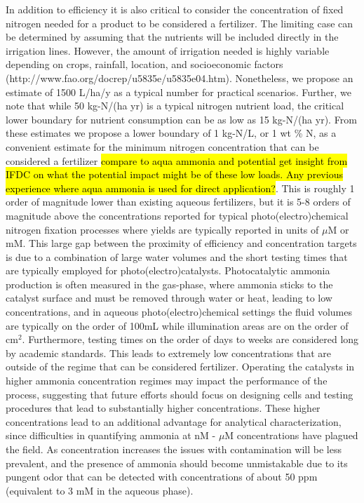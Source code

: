 In addition to efficiency it is also critical to consider the concentration of fixed nitrogen needed for a product to be considered a fertilizer. The limiting case can be determined by assuming that the nutrients will be included directly in the irrigation lines. However, the amount of irrigation needed is highly variable depending on crops, rainfall, location, and socioeconomic factors (http://www.fao.org/docrep/u5835e/u5835e04.htm). Nonetheless, we propose an estimate of 1500 L/ha/y as a typical number for practical scenarios. Further, we note that while 50 kg-N/(ha yr) is a typical nitrogen nutrient load, the critical lower boundary for nutrient consumption can be as low as 15 kg-N/(ha yr). From these estimates we propose a lower boundary of 1 kg-N/L, or 1 wt \% N, as a convenient estimate for the minimum nitrogen concentration that can be considered a fertilizer \hl{compare to aqua ammonia and potential get insight from IFDC on what the potential impact might be of these low loads. Any previous experience where aqua ammonia is used for direct application?}. This is roughly 1 order of magnitude lower than existing aqueous fertilizers, but it is 5-8 orders of magnitude above the concentrations reported for typical photo(electro)chemical nitrogen fixation processes where yields are typically reported in units of $\mu$M or mM. This large gap between the proximity of efficiency and concentration targets is due to a combination of large water volumes and the short testing times that are typically employed for photo(electro)catalysts. Photocatalytic ammonia production is often measured in the gas-phase, where ammonia sticks to the catalyst surface and must be removed through water or heat, leading to low concentrations, and in aqueous photo(electro)chemical settings the fluid volumes are typically on the order of 100mL while illumination areas are on the order of cm$^2$. Furthermore, testing times on the order of days to weeks are considered long by academic standards. This leads to extremely low concentrations that are outside of the regime that can be considered fertilizer. Operating the catalysts in higher ammonia concentration regimes may impact the performance of the process, suggesting that future efforts should focus on designing cells and testing procedures that lead to substantially higher concentrations. These higher concentrations lead to an additional advantage for analytical characterization, since difficulties in quantifying ammonia at nM - $\mu$M concentrations have plagued the field. As concentration increases the issues with contamination will be less prevalent, and the presence of ammonia should become unmistakable due to its pungent odor that can be detected with concentrations of about 50 ppm\cite{Leonardos_1969} (equivalent to 3 mM in the aqueous phase).

